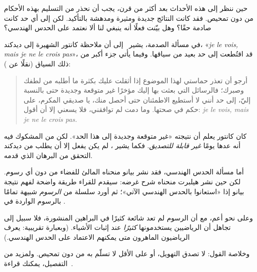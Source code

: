 \documentclass[../../../include/open-logic-section]{subfiles}
\begin{document}


حين ننظر إلى هذه الأحداث بعد أكثر من قرن، يجب أن نحذر من التسليم بهذه
الأحكام من دون تمحيص. فقد كانت النتائج جديدة ومثيرة ومدهشة بالتأكيد.
لكن إلى أي حد كانت صادمة حقًا؟ وهل بيّنت فعلًا أنه ينبغي لنا ألا نعتمد
على الحدس الهندسي؟

في مسألة الصدمة، يشير~\citet{Gouvea2011} إلى أن ملاحظة كانتور الشهيرة
إلى ديدكند، «\emph{je le vois, mais je ne le crois pas}»، قد اقتُطعت
إلى حد بعيد من سياقها. وفيما يأتي جزء أكبر من ذلك السياق (نقلًا عن
\citeauthor{Gouvea2011}):
\begin{quote}
أرجو أن تعذر حماستي لهذا الموضوع إذا أثقلت عليك بكثرة ما أطلبه من
لطفك وصبرك؛ فالرسائل التي بعثت بها إليك مؤخرًا غير متوقعة وجديدة حتى
بالنسبة إليّ، إلى حد أنني لا أستطيع الاطمئنان حتى أحصل منك، يا صديقي
المكرم، على حكم في صحتها. وما دمت لم توافقني، فلا يسعني إلا أن أقول:
\emph{je le vois, mais je ne le crois pas.}
\end{quote}
كان كانتور يعلم أن نتيجته «غير متوقعة وجديدة إلى هذا الحد». لكن من
المشكوك فيه أنه عدها يومًا \emph{غير قابلة للتصديق}. فكما يشير
\citeauthor{Gouvea2011}، لم يكن يفعل إلا أن يطلب من ديدكند التحقق من
البرهان الذي قدمه.

أما مسألة الحدس الهندسي، فقد نشر بيانو منحناه المالئ للفضاء من دون أي
رسوم. لكن حين نشر هيلبرت منحناه شرح غرضه: سيقدم للقراء طريقة واضحة
لفهم نتيجة بيانو إذا «استعانوا بالحدس الهندسي الآتي»؛ ثم أورد سلسلة
من \emph{الرسوم} شبيهة تمامًا بالرسوم الواردة في
.

وعلى نحو أعم، مع أن الرسوم لم تعد شائعة كثيرًا في البراهين المنشورة،
فلا سبيل إلى تجاهل أن الرياضيين يستخدمونها \emph{كثيرًا} عند إثبات
الأشياء. (وبعبارة تقريبية: يعرف الرياضيون الماهرون متى يمكنهم الاعتماد
على الحدس الهندسي.)

وخلاصة القول: لا تصدق التهويل، أو على الأقل لا تسلّم به من دون تمحيص.
ولمزيد من التفصيل، يمكنك قراءة~\citet{Giaquinto2007}.
\end{document}
